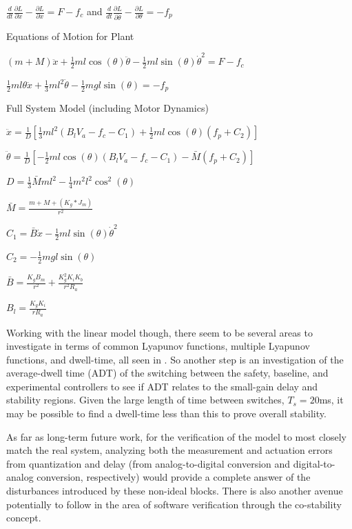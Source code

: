 \documentclass[conference]{IEEEtran}
\begin{document}
$\frac{d}{dt}\frac{\partial L}{\partial\dot{x}}-\frac{\partial L}{\partial x}=F-f_c$ and $\frac{d}{dt}\frac{\partial L}{\partial\dot{\theta}}-\frac{\partial L}{\partial \theta}=-f_p$

Equations of Motion for Plant

$\left(m+M\right)\ddot{x}+\frac{1}{2}ml\cos\left(\theta\right)\ddot{\theta}-\frac{1}{2}ml\sin\left(\theta\right)\dot{\theta}^2=F-f_c$

$\frac{1}{2}ml\mathsf{\theta}\ddot{x}+\frac{1}{3}ml^2\ddot{\theta}-\frac{1}{2}mgl\sin\left(\theta\right)=-f_p$

Full System Model (including Motor Dynamics)

$\ddot{x}=\frac{1}{D}\left[\frac{1}{3}ml^2\left(B_lV_a-f_c-C_1\right)+\frac{1}{2}ml\cos\left(\theta\right)\left(f_p+C_2\right)\right]$

$\ddot{\theta}=\frac{1}{D}\left[-\frac{1}{2}ml\cos\left(\theta\right)\left(B_lV_a-f_c-C_1\right)-\bar{M}\left(f_p+C_2\right)\right]$

$D=\frac{1}{3}\bar{M}ml^2-\frac{1}{4}m^2l^2\cos^2\left(\theta\right)$

$\bar{M}=\frac{m+M+(K_g*J_m)}{r^2}$

$C_1=\bar{B}\dot{x}-\frac{1}{2}ml\sin\left(\theta\right)\dot{\theta}^2$

$C_2=-\frac{1}{2}mgl\sin\left(\theta\right)$

$\bar{B}=\frac{K_gB_m}{r^2}+\frac{K_g^2K_iK_b}{r^2R_a}$

$B_l=\frac{K_gK_i}{rR_a}$

Working with the linear model though, there seem to be several areas to investigate in terms of common Lyapunov functions, multiple Lyapunov functions, and dwell-time, all seen in \cite{LiberzonSSC2003}.  So another step is an investigation of the average-dwell time (ADT) of the switching between the safety, baseline, and experimental controllers to see if ADT relates to the small-gain delay and stability regions.  Given the large length of time between switches, $T_s=20$ms, it may be possible to find a dwell-time less than this to prove overall stability.

As far as long-term future work, for the verification of the model to most closely match the real system, analyzing both the measurement and actuation errors from quantization and delay (from analog-to-digital conversion and digital-to-analog conversion, respectively) would provide a complete answer of the disturbances introduced by these non-ideal blocks.  There is also another avenue potentially to follow in the area of software verification through the co-stability concept.
\end{document}

